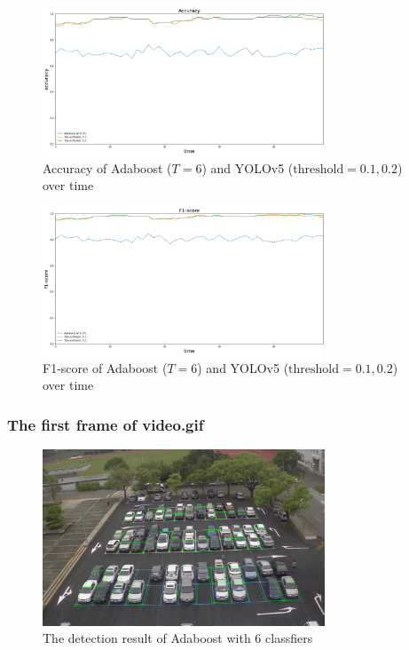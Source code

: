 \documentclass{article}[12pt]
\begin{document}
\begin{figure}[H]
    \centering
    \includegraphics[width=0.75\textwidth]{figure/Accuracy_all.png}
    \caption{Accuracy of Adaboost ($T=6$) and YOLOv5 ($\text{threshold}=0.1, 0.2$) over time}
    \label{fig:acc_all}
\end{figure}

\begin{figure}[H]
    \centering
    \includegraphics[width=0.75\textwidth]{figure/F1-score_all.png}
    \caption{F1-score of Adaboost ($T=6$) and YOLOv5 ($\text{threshold}=0.1, 0.2$) over time}
    \label{fig:f1_all}
\end{figure}

\subsubsection{The first frame of video.gif}

\begin{figure}[H]
    \centering
    \includegraphics[width=0.75\textwidth]{figure/Adaboost_first_frame_6.png}
    \caption{The detection result of Adaboost with 6 classfiers}
\end{figure}
\end{document}
